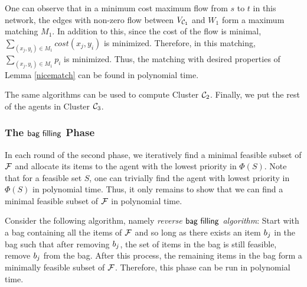 One can observe that in a minimum cost maximum flow from $s$ to $t$ in this network, the edges with non-zero flow between $V_{\mathcal{C}_1}$ and $W_1$ form a maximum matching $M_1$. In addition to this, since the cost of the flow is minimal, $\sum_{(x_j,y_i) \in M_1} cost(x_j,y_i)$ is minimized. Therefore, in this matching, 
$\sum_{(x_j,y_i) \in M_1} p_i$
is minimized. Thus, the matching with desired properties of Lemma \ref{nicematch} can be found in polynomial time.

The same algorithms can be used to compute Cluster $\mathcal{C}_2$. Finally, we put the rest of the agents in Cluster $\mathcal{C}_3$.


\subsubsection{The $\textsf{bag filling}$ Phase}\label{sphase}
In each round of the second phase, we iteratively find a minimal feasible subset of $\mathcal{F}$ and allocate its items to the agent with the lowest priority in $\Phi(S)$.  Note that for a feasible set $S$, one can trivially find the agent with lowest priority in $\Phi(S)$ in polynomial time. Thus, it only remains to show that we can find a minimal feasible subset of $\mathcal{F}$ in polynomial time. 

Consider the following algorithm, namely \emph{reverse $\textsf{bag filling}$ algorithm}: Start with a bag containing all the items of $\mathcal{F}$ and so long as there exists an item $b_j$ in the bag such that after removing $b_j$, the set of items in the bag is still feasible, remove $b_j$ from the bag. After this process, the remaining items in the bag  form  a minimally feasible subset of $\mathcal{F}$. Therefore, this phase can be run in polynomial time.

